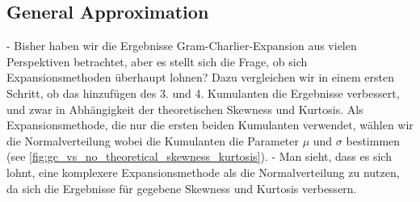 \subsection{General Approximation}
- Bisher haben wir die Ergebnisse Gram-Charlier-Expansion aus vielen Perspektiven betrachtet, aber es stellt sich die Frage, ob sich Expansionsmethoden überhaupt lohnen? Dazu vergleichen wir in einem ersten Schritt, ob das hinzufügen des 3. und 4. Kumulanten die Ergebnisse verbessert, und zwar in Abhängigkeit der theoretischen Skewness und Kurtosis. Als Expansionsmethode, die nur die ersten beiden Kumulanten verwendet, wählen wir die Normalverteilung wobei die Kumulanten die Parameter $\mu$ und $\sigma$ bestimmen (see \ref{fig:gc_vs_no_theoretical_skewness_kurtosis}).
- Man sieht, dass es sich lohnt, eine komplexere Expansionsmethode als die Normalverteilung zu nutzen, da sich die Ergebnisse für gegebene Skewness und Kurtosis verbessern.

